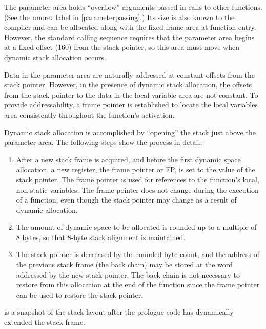 \documentclass[english,11pt,twoside,toc=bib,toc=idx]{scrreprt}
\newcommand{\jumplabel}[1]{\textsf{‹#1›}}
\newcommand{\STACKSIZE}{160}
\newcommand{\STACKSIZE}{96}
\begin{document}
The parameter area holds ``overflow'' arguments passed in calls to
other functions.  (See the \jumplabel{more} label in
\cref{parameterpassing}.)  Its size is also known to the compiler and can
be allocated along with the fixed frame area at function entry.  However,
the standard calling sequence requires that the parameter area begins
at a fixed offset (\STACKSIZE{}) from the stack pointer, so this area must
move when dynamic stack allocation occurs.

Data in the parameter area are naturally addressed at
constant offsets from the stack pointer.  However, in the presence of
dynamic stack allocation, the offsets from the stack pointer to the
data in the local-variable area are not constant.  To provide
addressability, a frame pointer is established to locate the local
variables area consistently throughout the function's
activation.

Dynamic stack allocation is accomplished by ``opening'' the stack
just above the parameter area.  The following steps show the
process in detail:

\begin{enumerate}
\item After a new stack frame is acquired, and before the
first dynamic space allocation, a new register, the frame pointer or
FP, is set to the value of the stack pointer.  The frame pointer is
used for references to the function's local, non-static variables.  The
frame pointer does not change during the execution of a function, even
though the stack pointer may change as a result of dynamic
allocation.

\item The amount of dynamic space to be allocated is rounded
up to a multiple of 8 bytes, so that 8-byte stack alignment is
maintained.

\item The stack pointer is decreased by the rounded byte
count, and the address of the previous stack frame (the back chain)
may be stored at the word addressed by the new stack pointer.  The back
chain is not necessary to restore from this allocation at the end of
the function since the frame pointer can be used to restore the stack
pointer.

\end{enumerate}

 is a snapshot of the stack layout after the
prologue code has dynamically extended the stack frame.
\end{document}
